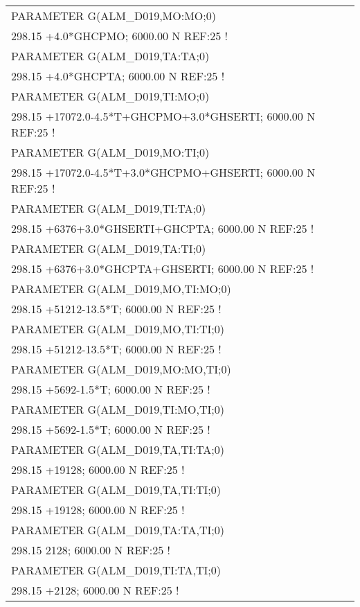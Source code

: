 \begin{longtable}[H]{ l l l }
	PARAMETER G(ALM\_D019,MO:MO;0) & & \\
	\multicolumn{3}{l}{298.15 +4.0*GHCPMO; 6000.00 N REF:25 !}\\
	PARAMETER G(ALM\_D019,TA:TA;0) & & \\ 
	\multicolumn{3}{l}{298.15 +4.0*GHCPTA; 6000.00 N REF:25 !}\\
	PARAMETER G(ALM\_D019,TI:MO;0) & & \\
	\multicolumn{3}{l}{298.15 +17072.0-4.5*T+GHCPMO+3.0*GHSERTI;    6000.00 N REF:25 !}\\
	PARAMETER G(ALM\_D019,MO:TI;0) & & \\
	\multicolumn{3}{l}{298.15 +17072.0-4.5*T+3.0*GHCPMO+GHSERTI;    6000.00 N REF:25 !}\\
	PARAMETER G(ALM\_D019,TI:TA;0) & & \\
	\multicolumn{3}{l}{298.15 +6376+3.0*GHSERTI+GHCPTA; 6000.00 N REF:25 !}\\
	PARAMETER G(ALM\_D019,TA:TI;0) & & \\
	\multicolumn{3}{l}{298.15 +6376+3.0*GHCPTA+GHSERTI; 6000.00 N REF:25 !}\\
	PARAMETER G(ALM\_D019,MO,TI:MO;0) & & \\
	\multicolumn{3}{l}{298.15 +51212-13.5*T; 6000.00 N REF:25 !}\\
	PARAMETER G(ALM\_D019,MO,TI:TI;0) & & \\
	\multicolumn{3}{l}{298.15 +51212-13.5*T; 6000.00 N REF:25 !}\\
	PARAMETER G(ALM\_D019,MO:MO,TI;0) & & \\
	\multicolumn{3}{l}{298.15 +5692-1.5*T; 6000.00 N REF:25 !}\\
	PARAMETER G(ALM\_D019,TI:MO,TI;0) & & \\
	\multicolumn{3}{l}{298.15 +5692-1.5*T; 6000.00 N REF:25 !}\\	 
	PARAMETER G(ALM\_D019,TA,TI:TA;0) & & \\
	\multicolumn{3}{l}{298.15 +19128; 6000.00 N REF:25 !}\\
	PARAMETER G(ALM\_D019,TA,TI:TI;0) & & \\
	\multicolumn{3}{l}{298.15 +19128; 6000.00 N REF:25 !}\\	 
	PARAMETER G(ALM\_D019,TA:TA,TI;0) & & \\
	\multicolumn{3}{l}{298.15 2128; 6000.00 N REF:25 !}\\
	PARAMETER G(ALM\_D019,TI:TA,TI;0) & & \\ 
	\multicolumn{3}{l}{298.15 +2128; 6000.00 N REF:25 !}\\

\end{longtable}
